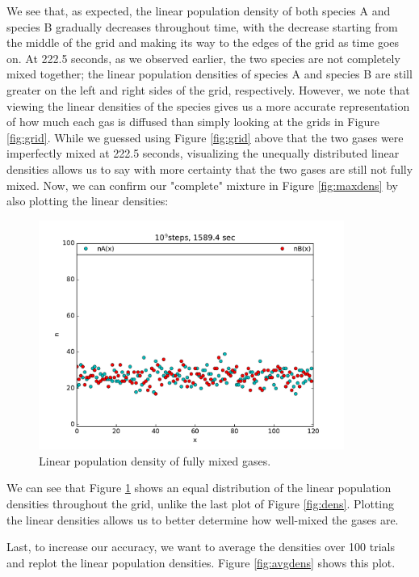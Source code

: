 \documentclass{article}
\begin{document}
\noindent We see that, as expected, the linear population density of both species A and species B gradually decreases throughout time, with the decrease starting from the middle of the grid and making its way to the edges of the grid as time goes on. At 222.5 seconds, as we observed earlier, the two species are not completely mixed together; the linear population densities of species A and species B are still greater on the left and right sides of the grid, respectively. However, we note that viewing the linear densities of the species gives us a more accurate representation of how much each gas is diffused than simply looking at the grids in Figure \ref{fig:grid}. While we guessed using Figure \ref{fig:grid} above that the two gases were imperfectly mixed at 222.5 seconds, visualizing the unequally distributed linear densities allows us to say with more certainty that the two gases are still not fully mixed. Now, we can confirm our "complete" mixture in Figure \ref{fig:maxdens} by also plotting the linear densities:\par

\begin{figure}[H]
\centering
\includegraphics[width=10cm]{figures/GP1_3_maxlimit_density.pdf}
\caption{Linear population density of fully mixed gases.}
\label{fig:maxdensplot}
\end{figure}

\noindent We can see that Figure \ref{fig:maxdensplot} shows an equal distribution of the linear population densities throughout the grid, unlike the last plot of Figure \ref{fig:dens}. Plotting the linear densities allows us to better determine how well-mixed the gases are.\par

Last, to increase our accuracy, we want to average the densities over 100 trials and replot the linear population densities. Figure \ref{fig:avgdens} shows this plot.\par
\end{document}
